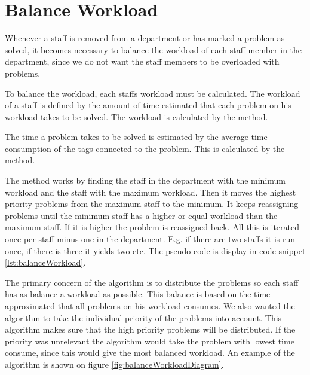 \section{Balance Workload}
Whenever a staff is removed from a department or has marked a problem as solved, 
it becomes necessary to balance the workload of each staff member in the department, since we do not want the staff members to be overloaded with problems. 

To balance the workload, each staffs workload must be calculated. 
The workload of a staff is defined by the amount of time estimated that each problem on his workload takes to be solved. 
The workload is calculated by the  method.

The time a problem takes to be solved is estimated by the average time consumption of the tags connected to the problem. 
This is calculated by the  method.

The  method works by finding the staff in the department with the minimum workload and the staff with the maximum workload. Then it moves the highest priority problems from the maximum staff to the minimum. 
It keeps reassigning problems until the minimum staff has a higher or equal workload than the maximum staff. If it is higher the problem is reassigned back. 
All this is iterated once per staff minus one in the department. 
E.g. if there are two staffs it is run once, if there is three it yields two etc. 
The pseudo code is display in code snippet \ref{lst:balanceWorkload}.

The primary concern of the algorithm is to distribute the problems so each staff has as balance a workload as possible. 
This balance is based on the time approximated that all problems on his workload consumes. 
We also wanted the algorithm to take the individual priority of the problems into account. 
This algorithm makes sure that the high priority problems will be distributed. 
If the priority was unrelevant the algorithm would take the problem with lowest time consume, since this would give the most balanced workload. 
An example of the algorithm is shown on figure \ref{fig:balanceWorkloadDiagram}. 



